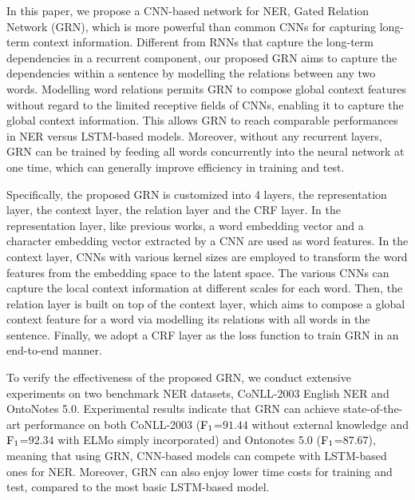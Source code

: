 \documentclass[letterpaper]{article} \usepackage{aaai19}  \usepackage{times}  \usepackage{helvet}  \usepackage{courier}  \usepackage{url}  \usepackage{graphicx}  \usepackage{amsmath}
\newcommand{\ie}{\text{i.e.,}}
\newcommand{\GRN}{GRN}
\begin{document}
In this paper, we propose a CNN-based network for NER, \ie{} Gated Relation Network (\GRN{}), which is more powerful than common CNNs for capturing long-term context information. Different from RNNs that capture the long-term dependencies in a recurrent component, our proposed \GRN{} aims to capture the dependencies within a sentence by modelling the relations between any two words. Modelling word relations permits \GRN{} to compose global context features without regard to the limited receptive fields of CNNs, enabling it to capture the global context information. This allows \GRN{} to reach comparable performances in NER versus LSTM-based models. Moreover, without any recurrent layers, \GRN{} can be trained by feeding all words concurrently into the neural network at one time, which can generally improve efficiency in training and test.

Specifically, the proposed \GRN{} is customized into 4 layers, \ie{} the representation layer, the context layer, the relation layer and the CRF layer. In the representation layer, like previous works, a word embedding vector and a character embedding vector extracted by a CNN are used as word features. In the context layer, CNNs with various kernel sizes are employed to transform the word features from the embedding space to the latent space. The various CNNs can capture the local context information at different scales for each word. Then, the relation layer is built on top of the context layer, which aims to compose a global context feature for a word via modelling its relations with all words in the sentence. Finally, we adopt a CRF layer as the loss function to train \GRN{} in an end-to-end manner.

To verify the effectiveness of the proposed \GRN{}, we conduct extensive experiments on two benchmark NER datasets, \ie{} CoNLL-2003 English NER and OntoNotes 5.0. Experimental results indicate that \GRN{} can achieve state-of-the-art performance on both CoNLL-2003 ($\rm F_1$=$91.44$ without external knowledge and $\rm F_1$=$92.34$ with ELMo \cite{peters2018deep} simply incorporated) and Ontonotes 5.0 ($\rm F_1$=$87.67$), meaning that using \GRN{}, CNN-based models can compete with LSTM-based ones for NER. Moreover, \GRN{} can also enjoy lower time costs for training and test, compared to the most basic LSTM-based model.
\end{document}
